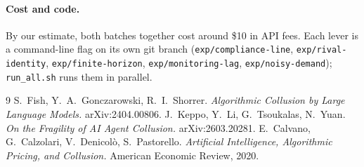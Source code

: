 \documentclass[11pt,a4paper]{article}
\begin{document}
\paragraph{Cost and code.} By our estimate, both batches together cost around \$10 in API fees. Each lever
is a command-line flag on its own git branch (\texttt{exp/compliance-line},
\texttt{exp/rival-identity}, \texttt{exp/finite-horizon}, \texttt{exp/monitoring-lag},
\texttt{exp/noisy-demand}); \texttt{run\_all.sh} runs them in parallel.

\begin{thebibliography}{9}
 S.~Fish, Y.~A.~Gonczarowski, R.~I.~Shorrer.
  \emph{Algorithmic Collusion by Large Language Models.} arXiv:2404.00806.
 J.~Keppo, Y.~Li, G.~Tsoukalas, N.~Yuan.
  \emph{On the Fragility of AI Agent Collusion.} arXiv:2603.20281.
 E.~Calvano, G.~Calzolari, V.~Denicol\`o, S.~Pastorello.
  \emph{Artificial Intelligence, Algorithmic Pricing, and Collusion.} American Economic Review, 2020.
\end{thebibliography}
\end{document}
